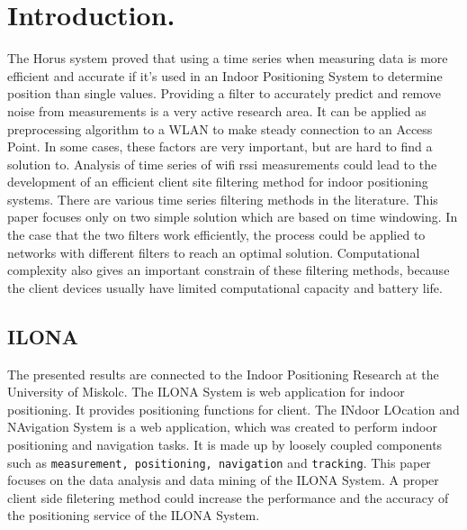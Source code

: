 \chapter{Introduction.}
\label{chap:introduction}


The Horus system proved that using a time series when measuring data is more efficient and accurate if it's used in an Indoor Positioning System to determine position than single values.
Providing a filter to accurately predict and remove noise from measurements is a very active research area.
It can be applied as preprocessing algorithm to a WLAN to make steady connection to an Access Point.
In some cases, these factors are very important, but are hard to find a solution to. 
Analysis of time series of wifi rssi measurements could lead to the development of an efficient client site filtering method for indoor positioning systems.
There are various time series filtering methods in the literature. This paper focuses only on two simple solution which are based on time windowing.
In the case that the two filters work efficiently, the process could be applied to networks with different filters to reach an optimal solution.
Computational complexity also gives an important constrain of these filtering methods, because the client devices usually have limited computational capacity and battery life.

\section{ILONA}
The presented results are connected to the Indoor Positioning Research at the University of Miskolc. The ILONA System is web application for indoor positioning. It provides positioning functions for client. 
The INdoor LOcation and NAvigation System is a web application, which was
created to perform indoor positioning and navigation tasks.
It is made up by loosely coupled components such as \texttt{measurement, positioning, navigation} and \texttt{tracking}.
This paper focuses on the data analysis and data mining of the ILONA System.
A proper client side filetering method could increase the performance and the accuracy of the positioning service of the ILONA System.

